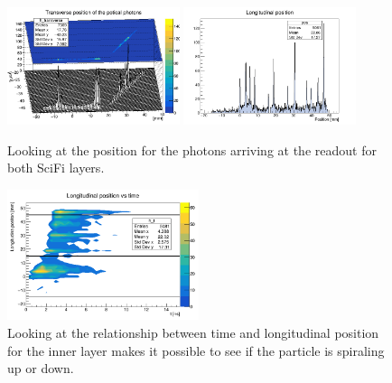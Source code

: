 \begin{refsection}
        \begin{figure}
            \centering
            \includegraphics[width=0.45\textwidth]{Figures/muEDM/Tracker/fPosInXfPosInZ.png}
            \includegraphics[width=0.45\textwidth]{Figures/muEDM/Tracker/fPosInY.png}
            \caption{Looking at the position for the photons arriving at the readout for both SciFi layers.}
        \label{fig:geant4_position}
        \end{figure}
    
        \begin{figure}
            \centering
            \includegraphics[width=0.5\textwidth]{Figures/muEDM/Tracker/fPosInYfTimeIn.png}
            \caption{Looking at the relationship between time and longitudinal position for the inner layer makes it possible to see if the particle is spiraling up or down.}
        \label{fig:geant4_time_pos}
        \end{figure}


\end{refsection}
